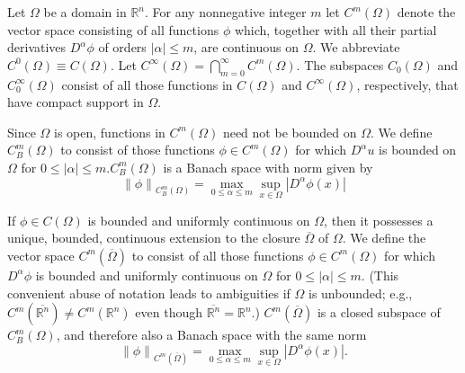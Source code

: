 \begin{para}
  Let $\Omega$ be a domain in $\mathbb{R}^n$. For any nonnegative integer $m$ let $C^m(\Omega)$ denote the vector space consisting of all functions $\phi$ which, together with all their partial derivatives $D^\alpha \phi$ of orders $|\alpha| \leq m$, are continuous on $\Omega$. We abbreviate $C^0(\Omega) \equiv C(\Omega)$. Let $C^{\infty}(\Omega)=\bigcap_{m=0}^{\infty} C^m(\Omega)$.
  The subspaces $C_0(\Omega)$ and $C_0^{\infty}(\Omega)$ consist of all those functions in $C(\Omega)$ and $C^{\infty}(\Omega)$, respectively, that have compact support in $\Omega$.
\end{para}


\begin{para}
  Since $\Omega$ is open, functions in $C^m(\Omega)$ need not be bounded on $\Omega$. We define $C_B^m(\Omega)$ to consist of those functions $\phi \in C^m(\Omega)$ for which $D^\alpha u$ is bounded on $\Omega$ for $0 \leq|\alpha| \leq m . C_B^m(\Omega)$ is a Banach space with norm given by
  \[
  \left\|\phi\right\|_{C_B^m(\Omega)}=\max _{0 \leq \alpha \leq m} \sup _{x \in \Omega}\left|D^\alpha \phi(x)\right|
  \]
\end{para}

\begin{para}
  If $\phi \in C(\Omega)$ is bounded and uniformly continuous on $\Omega$, then it possesses a unique, bounded, continuous extension to the closure $\overline{\Omega}$ of $\Omega$. We define the vector space $C^m(\overline{\Omega})$ to consist of all those functions $\phi \in C^m(\Omega)$ for which $D^\alpha \phi$ is bounded and uniformly continuous on $\Omega$ for $0 \leq|\alpha| \leq m$. (This convenient abuse of notation leads to ambiguities if $\Omega$ is unbounded; e.g., $C^m\left(\overline{\mathbb{R}^n}\right) \neq C^m\left(\mathbb{R}^n\right)$ even though $\overline{\mathbb{R}^n}=\mathbb{R}^n$.) $C^m(\overline{\Omega})$ is a closed subspace of $C_B^m(\Omega)$, and therefore also a Banach space with the same norm
  \[
  \left\|\phi\right\|_{C^m(\overline{\Omega})}=\max _{0 \leq \alpha \leq m} \sup _{x \in \Omega}\left|D^\alpha \phi(x)\right| .
  \]
\end{para}

